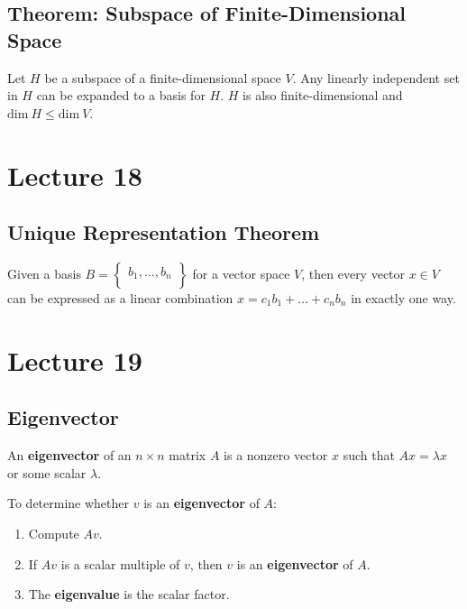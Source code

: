 \documentclass[12pt, letterpaper]{article}
\begin{document}
\subsection*{Theorem: Subspace of Finite-Dimensional Space}

Let $ H $ be a subspace of a finite-dimensional space $ V $. Any
linearly independent set in $ H $ can be expanded to a basis for $ H
$. $ H $ is also finite-dimensional and $ \textrm{dim} \: H \leq
\textrm{dim} \: V $.

\section*{Lecture 18}

\subsection*{Unique Representation Theorem}

Given a basis $ B =
\begin{Bmatrix}
  b_1, \hdots, b_n \\
\end{Bmatrix} $ for a vector space $ V $, then every vector $ x \in V
$ can be expressed as a linear combination $ x = c_1b_1 + \hdots +
c_nb_n $ in exactly one way.

\section*{Lecture 19}

\subsection*{Eigenvector}

An \textbf{eigenvector} of an $ n \times n $ matrix $ A $ is a
nonzero vector $ x $ such that $ Ax = \lambda x $ or some scalar $ \lambda $.
\bigskip

To determine whether $ v $ is an \textbf{eigenvector} of $ A $:

\begin{enumerate}
  \item Compute $ Av $.
  \item If $ Av $ is a scalar multiple of $ v $, then $ v $ is an
    \textbf{eigenvector} of $ A $.
  \item The \textbf{eigenvalue} is the scalar factor.
\end{enumerate}

\bigskip
\end{document}
